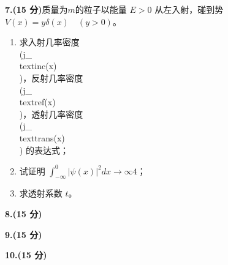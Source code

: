 \textbf{7.(15 分)}质量为$m$的粒子以能量 $E > 0$ 从左入射，碰到势 $V(x) = y\delta(x) \quad (y > 0)$。

\begin{enumerate}
    \item 求入射几率密度 \\(j_{\\text{inc}}(x)\\)，反射几率密度 \\(j_{\\text{ref}}(x)\\)，透射几率密度 \\(j_{\\text{trans}}(x)\\) 的表达式；
    \item 试证明 $\int_{-\infty}^{0} \left| \psi(x) \right|^2 dx \to \infty4$；
    \item 求透射系数 $t$。
\end{enumerate}

\textbf{8.(15 分)}

\textbf{9.(15 分)}

\textbf{10.(15 分)}